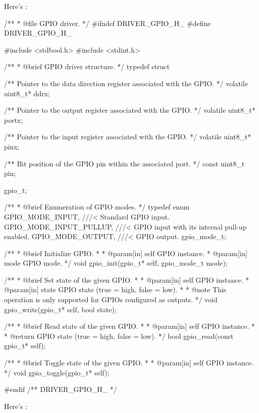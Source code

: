Here's :

\begin{ccode}
/**
 * @file GPIO driver.
 */
#ifndef DRIVER_GPIO_H_
#define DRIVER_GPIO_H_

#include <stdbool.h>
#include <stdint.h>

/**
 * @brief GPIO driver structure.
 */
typedef struct
{
    /** Pointer to the data direction register associated with the GPIO. */
    volatile uint8_t* ddrx;

    /** Pointer to the output register associated with the GPIO. */
    volatile uint8_t* portx;

    /** Pointer to the input register associated with the GPIO. */
    volatile uint8_t* pinx;

    /** Bit position of the GPIO pin within the associated port. */
    const uint8_t pin;
} gpio_t;

/**
 * @brief Enumeration of GPIO modes.
 */
typedef enum
{
    GPIO_MODE_INPUT,        ///< Standard GPIO input.
    GPIO_MODE_INPUT_PULLUP, ///< GPIO input with its internal pull-up enabled.
    GPIO_MODE_OUTPUT,       ///< GPIO output.
} gpio_mode_t;

/**
 * @brief Initialize GPIO.
 *
 * @param[in] self GPIO instance.
 * @param[in] mode GPIO mode.
 */
void gpio_init(gpio_t* self, gpio_mode_t mode);

/**
 * @brief Set state of the given GPIO.
 *
 * @param[in] self GPIO instance.
 * @param[in] state GPIO state (true = high, false = low).
 *
 * @note This operation is only supported for GPIOs configured as outputs.
 */
void gpio_write(gpio_t* self, bool state);

/**
 * @brief Read state of the given GPIO.
 *
 * @param[in] self GPIO instance.
 *
 * @return GPIO state (true = high, false = low).
 */
bool gpio_read(const gpio_t* self);

/**
 * @brief Toggle state of the given GPIO.
 *
 * @param[in] self GPIO instance.
 */
void gpio_toggle(gpio_t* self);

#endif /** DRIVER_GPIO_H_ */
\end{ccode}

\noindent Here's :

